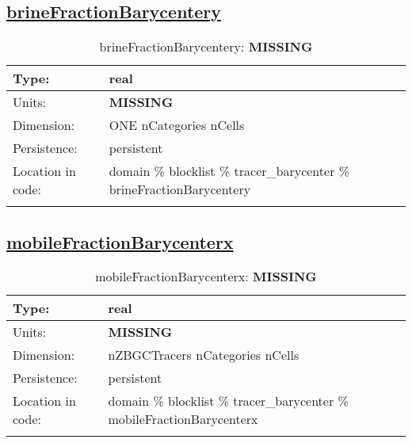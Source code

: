 \subsection[brineFractionBarycentery]{\hyperref[sec:var_tab_tracer_barycenter]{brineFractionBarycentery}}
\label{subsec:var_sec_tracer_barycenter_brineFractionBarycentery}
\begin{center}
\begin{longtable}{| p{2.0in} | p{4.0in} |}
        \hline 
        Type: & real \\
        \hline 
        Units: & {\bf \color{red} MISSING} \\
        \hline 
        Dimension: & ONE nCategories nCells \\
        \hline 
        Persistence: & persistent \\
        \hline 
         Location in code: & domain \% blocklist \% tracer\_barycenter \% brineFractionBarycentery \\
         \hline 
    \caption{brineFractionBarycentery: {\bf \color{red} MISSING}}
\end{longtable}
\end{center}
\subsection[mobileFractionBarycenterx]{\hyperref[sec:var_tab_tracer_barycenter]{mobileFractionBarycenterx}}
\label{subsec:var_sec_tracer_barycenter_mobileFractionBarycenterx}
\begin{center}
\begin{longtable}{| p{2.0in} | p{4.0in} |}
        \hline 
        Type: & real \\
        \hline 
        Units: & {\bf \color{red} MISSING} \\
        \hline 
        Dimension: & nZBGCTracers nCategories nCells \\
        \hline 
        Persistence: & persistent \\
        \hline 
         Location in code: & domain \% blocklist \% tracer\_barycenter \% mobileFractionBarycenterx \\
         \hline 
    \caption{mobileFractionBarycenterx: {\bf \color{red} MISSING}}
\end{longtable}
\end{center}
